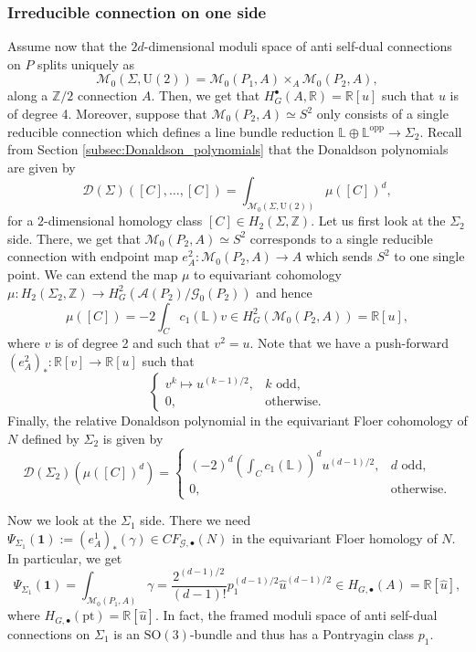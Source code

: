 \documentclass[11pt,colorinlistoftodos]{amsart}
\numberwithin{equation}{subsection}
\theoremstyle{plain}
\theoremstyle{definition}
\theoremstyle{remark}
\newcommand{\R}{\mathbb{R}}
\newcommand{\Z}{\mathbb{Z}}
\newcommand{\calD}{\mathcal{D}}
\newcommand{\calA}{\mathcal{A}}
\newcommand{\calG}{\mathcal{G}}
\newcommand{\calM}{\mathcal{M}}
\begin{document}
\subsubsection{Irreducible connection on one side} 
Assume now that the $2d$-dimensional moduli space of anti self-dual connections on $P$ splits uniquely as 
\[
\calM_0(\Sigma,\mathrm{U}(2))=\calM_0(P_1,A)\times_A \calM_0(P_2,A),
\]
along a $\Z/2$ connection $A$. Then, we get that $H_G^\bullet(A,\R)=\R[u]$ such that $u$ is of degree 4. Moreover, suppose that $\calM_0(P_2,A)\simeq S^2$ only consists of a single reducible connection which defines a line bundle reduction $\mathbb{L}\oplus \mathbb{L}^\mathrm{opp}\to \Sigma_2$. Recall from Section \ref{subsec:Donaldson_polynomials} that the Donaldson polynomials are given by
\[
\calD(\Sigma)([C],\ldots,[C])=\int_{\calM_0(\Sigma,\mathrm{U}(2))}\mu([C])^d,
\]
for a $2$-dimensional homology class $[C]\in H_2(\Sigma,\Z)$. Let us first look at the $\Sigma_2$ side. There, we get that $\calM_0(P_2,A)\simeq S^2$ corresponds to a single reducible connection with endpoint map $e_A^2\colon \calM_0(P_2,A)\to A$ which sends $S^2$ to one single point. We can extend the map $\mu$ to equivariant cohomology $\mu\colon H_2(\Sigma_2,\Z)\to H^2_G(\calA(P_2)/\calG_0(P_2))$ and hence 
\[
\mu([C])=-2\int_{C}c_1(\mathbb{L})v\in H^2_G(\calM_0(P_2,A))=\R[u],
\]
where $v$ is of degree 2 and such that $v^2=u$. Note that we have a push-forward $(e^2_A)_*\colon \R[v]\to \R[u]$ such that 
\[
\begin{cases}v^k\mapsto u^{(k-1)/2},&\text{$k$ odd},\\ 0, &\text{otherwise}.\end{cases}
\]
Finally, the relative Donaldson polynomial in the equivariant Floer cohomology of $N$ defined by $\Sigma_2$ is given by 
\begin{equation}
    \label{eq:Donaldson_equivariant_Sigma_2}
    \calD(\Sigma_2)(\mu([C])^d)=\begin{cases}(-2)^d\left({\displaystyle\int_Cc_1(\mathbb{L})}\right)^du^{(d-1)/2},&\text{$d$ odd},\\ 0,&\text{otherwise}.\end{cases}
\end{equation}

Now we look at the $\Sigma_1$ side. There we need $\Psi_{\Sigma_1}(\boldsymbol{1}):=(e^1_A)_*(\gamma)\in CF_{\calG,\bullet}(N)$ in the equivariant Floer homology of $N$. In particular, we get 
\[
\Psi_{\Sigma_1}(\boldsymbol{1})=\int_{\calM_0(P_1,A)}\gamma=\frac{2^{(d-1)/2}}{(d-1)!}p_1^{(d-1)/2}\hat{u}^{(d-1)/2}\in H_{G,\bullet}(A)=\R[\hat{u}],
\]
where $H_{G,\bullet}(\mathrm{pt})=\R[\hat u]$. In fact, the framed moduli space of anti self-dual connections on $\Sigma_1$ is an $\mathrm{SO}(3)$-bundle and thus has a Pontryagin class $p_1$.
\end{document}
